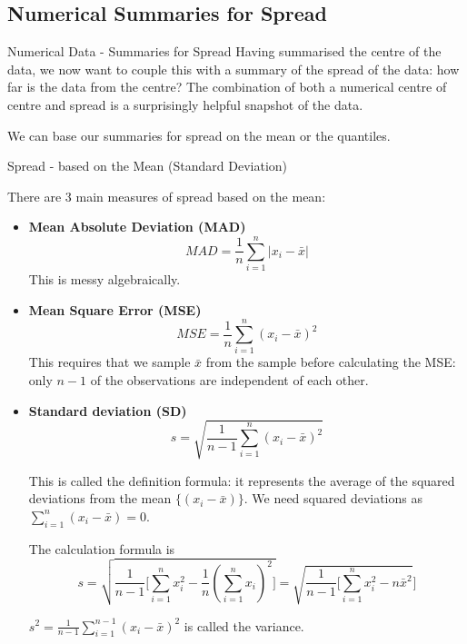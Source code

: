 \documentclass[t,xcolor=pdftex,dvipsnames,table]{beamer}\usepackage[]{graphicx}\usepackage[]{color}
\begin{document}
\subsection[]{Numerical Summaries for Spread}
\begin{frame}[fragile]{Numerical Data - Summaries for Spread}
Having summarised the centre of the data, we now want to couple this with a summary of the spread of the data: how far is the data from the centre? The combination of both a numerical centre of centre and spread is a surprisingly helpful snapshot of the data.

\vspace{.5cm}
We can base our summaries for spread on the mean or the quantiles.
\end{frame}

\begin{frame}[fragile]{Spread - based on the Mean (Standard Deviation)}

There are 3 main measures of spread based on the mean:
\begin{itemize}
\item {\bf Mean Absolute Deviation (MAD)}
\[ MAD = \frac{1}{n} \sum_{i=1}^{n} | x_{i} - \bar{x} | \]
This is messy algebraically.

\vspace{.5cm}
\item {\bf Mean Square Error (MSE)}
\[ MSE = \frac{1}{n} \sum_{i=1}^{n} (x_{i} - \bar{x})^2 \]
This requires that we sample $\bar{x}$ from the sample before calculating the MSE: only $n-1$ of the observations are independent of each other.
\end{itemize}
\end{frame}

\begin{frame}[fragile]{}
\begin{itemize}
\item {\bf Standard deviation (SD)}
\[ s= \sqrt{\frac{1}{n-1}  \sum_{i=1}^{n} (x_{i} - \bar{x})^2 } \]

This is called the definition formula: it represents the average of the squared deviations from the mean $\{ (x_{i} - \bar{x}) \}$. We need squared deviations as $\sum_{i=1}^{n} (x_{i} - \bar{x}) = 0$.

\vspace{.5cm}
The calculation formula is
\[ s= \sqrt{\frac{1}{n-1} \big[ \sum_{i=1}^{n} x_{i}^2 - \frac{1}{n} (\sum_{i=1}^{n} x_{i})^2 \big] }
= \sqrt{ \frac{1}{n-1} \big[ \sum_{i=1}^{n} x_{i}^2 - n \bar{x}^2} \big]
\]

\vspace{.5cm}
$s^2 = \frac{1}{n-1} \sum_{i=1}^{n-1} (x_{i} - \bar{x})^2$ is called the variance. 
\end{itemize}
\end{frame}
\end{document}
